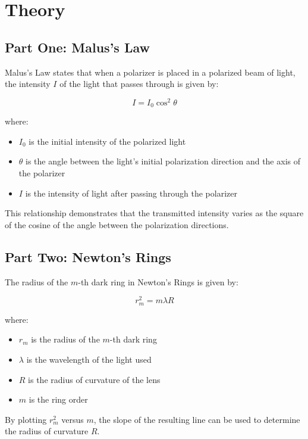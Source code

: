 \documentclass[journal]{IEEEtran}
\begin{document}
\section{Theory}

\subsection{Part One: Malus's Law}
Malus's Law states that when a polarizer is placed in a polarized beam of light, the intensity $I$ of the light that passes through is given by:

\begin{equation}
    I = I_0\cos^2\theta
    \label{eq:malus}
\end{equation}

where:
\begin{itemize}
    \item $I_0$ is the initial intensity of the polarized light
    \item $\theta$ is the angle between the light's initial polarization direction and the axis of the polarizer
    \item $I$ is the intensity of light after passing through the polarizer
\end{itemize}

This relationship demonstrates that the transmitted intensity varies as the square of the cosine of the angle between the polarization directions.

\subsection{Part Two: Newton's Rings}
The radius of the $m$-th dark ring in Newton's Rings is given by:

\begin{equation}
    r_m^2 = m \lambda R
    \label{eq:newtons_rings}
\end{equation}

where:
\begin{itemize}
    \item $r_m$ is the radius of the $m$-th dark ring
    \item $\lambda$ is the wavelength of the light used
    \item $R$ is the radius of curvature of the lens
    \item $m$ is the ring order
\end{itemize}
By plotting $r_m^2$ versus $m$, the slope of the resulting line can be used to determine the radius of curvature $R$.
\end{document}
